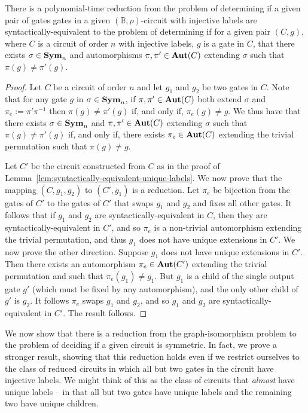 \documentclass[../paper.tex]{subfiles}
\begin{document}
\begin{lem}
  There is a polynomial-time reduction from the problem of determining if a
  given pair of gates gates in a given $(\mathbb{B}, \rho)$-circuit with
  injective labels are syntactically-equivalent to the problem of determining if
  for a given pair $(C, g)$, where $C$ is a circuit of order $n$ with injective
  labels, $g$ is a gate in $C$, that there exists $\sigma \in \text{\textbf{Sym}}_n$ and
  automorphisms $\pi, \pi' \in \text{\textbf{Aut}}(C)$ extending $\sigma$ such that $\pi (g)
  \neq \pi' (g)$.
  \label{lem:syntactically-equivilent-unique-extensions}
\end{lem}
\begin{proof}
  Let $C$ be a circuit of order $n$ and let $g_1$ and $g_2$ be two gates in $C$.
  Note that for any gate $g$ in $\sigma \in \text{\textbf{Sym}}_n$, if $\pi, \pi' \in \text{\textbf{Aut}}(C)$
  both extend $\sigma$ and $\pi_e := \pi'\pi^{-1}$ then $\pi(g) \neq \pi'(g)$
  if, and only if, $\pi_e (g) \neq g$. We thus have that there exists $\sigma
  \in \text{\textbf{Sym}}_n$ and $\pi, \pi' \in \text{\textbf{Aut}}(C)$ extending $\sigma$ such that $\pi (g)
  \neq \pi'(g)$ if, and only if, there exists $\pi_e \in \text{\textbf{Aut}}(C)$ extending the
  trivial permutation such that $\pi (g) \neq g$.

  Let $C'$ be the circuit constructed from $C$ as in the proof of
  Lemma~\ref{lem:syntactically-equivalent-unique-labels}. We now prove that the
  mapping $(C, g_1, g_2)$ to $(C', g_1)$ is a reduction. Let $\pi_e$ be
  bijection from the gates of $C'$ to the gates of $C'$ that swaps $g_1$ and
  $g_2$ and fixes all other gates. It follows that if $g_1$ and $g_2$ are
  syntactically-equivalent in $C$, then they are syntactically-equivalent in
  $C'$, and so $\pi_e$ is a non-trivial automorphism extending the trivial
  permutation, and thus $g_1$ does not have unique extensions in $C'$. We now
  prove the other direction. Suppose $g_1$ does not have unique extensions in
  $C'$. Then there exists an automorphism $\pi_e \in \text{\textbf{Aut}}(C')$ extending the
  trivial permutation and such that $\pi_e(g_1) \neq g_1$. But $g_1$ is a child
  of the single output gate $g'$ (which must be fixed by any automorphism), and
  the only other child of $g'$ is $g_2$. It follows $\pi_e$ swaps $g_1$ and
  $g_2$, and so $g_1$ and $g_2$ are syntactically-equivalent in $C'$. The result
  follows.
\end{proof}

We now show that there is a reduction from the graph-isomorphism problem to the
problem of deciding if a given circuit is symmetric. In fact, we prove a
stronger result, showing that this reduction holds even if we restrict ourselves
to the class of reduced circuits in which all but two gates in the circuit have
injective labels. We might think of this as the class of circuits that
\emph{almost} have unique labels -- in that all but two gates have unique labels
and the remaining two have unique children.
\end{document}
